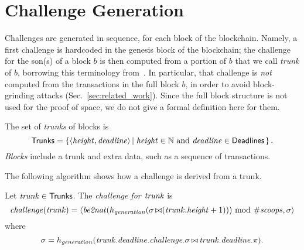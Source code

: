\section{Challenge Generation}\label{sec:challenge_generation}
%
Challenges are generated in sequence, for each block of the blockchain.
Namely, a first challenge is hardcoded in the genesis block of the blockchain;
the challenge for the son(s) of a block $b$ is then computed
from a portion of $b$ that we call \emph{trunk} of $b$, borrowing this terminology
from~\cite{CohenP19}. In particular, that challenge is \emph{not}
computed from the transactions in the full block $b$,
in order to avoid block-grinding attacks (Sec.~\ref{sec:related_work}).
Since the full block structure is not used for the proof of space, we do not give a formal definition
here for them.
%
\begin{definition}\label{def:block}
  The set of \emph{trunks} of blocks is
  \[
  {\mathsf{Trunks}}=\left\{\langle{\mathit{height}},{\mathit{deadline}}\rangle\left|\;{\mathit{height}}\in\mathbb{N}\text{ and }{\mathit{deadline}}\in{\mathsf{Deadlines}}\right.\right\}.
  \]
  \emph{Blocks} include a trunk and extra data, such as a sequence of transactions.
\end{definition}
%
The following algorithm shows how a challenge is derived from a trunk.
%
\begin{alg}[$\challenge(\trunk)$]\label{alg:challenge_from_signature}
  Let ${\mathit{trunk}}\in{\mathsf{Trunks}}$. The \emph{challenge for ${\mathit{trunk}}$} is
  \[
  {\mathit{challenge}}({\mathit{trunk}})=\langle{\mathit{be2nat}}(h_{\mathit{generation}}(\sigma\operatorname*{\bowtie}({\mathit{trunk}}.{\mathit{height}}+1)))\text{ mod }{\#\mathit{scoops}},\sigma\rangle
  \]
  where
  \[
  \sigma=h_{\mathit{generation}}({\mathit{trunk}}.{\mathit{deadline}}.{\mathit{challenge}}.\sigma\operatorname*{\bowtie}{\mathit{trunk}}.{\mathit{deadline}}.\pi).  
  \]
\end{alg}

